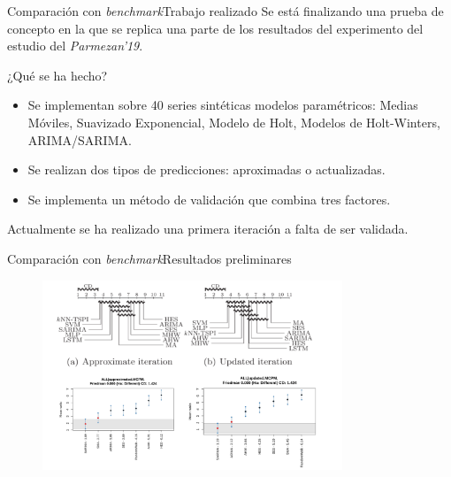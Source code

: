 \documentclass[12pt, aspectratio=169]{beamer} %
\begin{document}
\begin{frame}{Comparación con \textit{benchmark}}{Trabajo realizado}
  Se está finalizando una prueba de concepto en la que se replica una parte de los resultados del experimento del estudio del \textit{Parmezan'19}.
  \begin{block}{¿Qué se ha hecho?}
    \begin{itemize}
    \item Se implementan sobre 40 series sintéticas modelos paramétricos: Medias Móviles, Suavizado Exponencial, Modelo de Holt, Modelos de Holt-Winters, ARIMA/SARIMA. 
    \item Se realizan dos tipos de predicciones: aproximadas o actualizadas.
    \item Se implementa un método de validación que combina tres factores.
    \end{itemize}
  \end{block}
  Actualmente se ha realizado una primera iteración a falta de ser validada.

\end{frame}

\begin{frame}{Comparación con \textit{benchmark}}{Resultados preliminares}
  \begin{figure}
    \includegraphics[width=0.8\textwidth]{20210413_2_resultados.png}
    \label{fig:resultados}
  \end{figure}
\end{frame}
\end{document}
